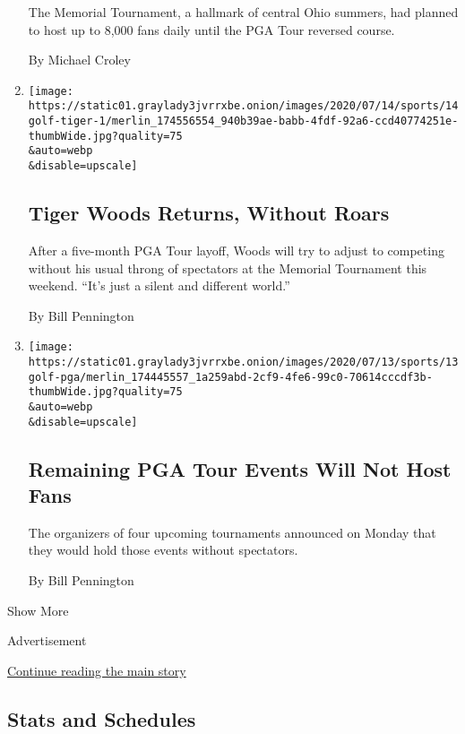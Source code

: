 \begin{enumerate}
  The Memorial Tournament, a hallmark of central Ohio summers, had
  planned to host up to 8,000 fans daily until the PGA Tour reversed
  course.

  By Michael Croley
\item
  \href{/2020/07/14/sports/golf/tiger-woods-memorial-tournament.html}{}

  \texttt{[image: https://static01.graylady3jvrrxbe.onion/images/2020/07/14/sports/14golf-tiger-1/merlin\_174556554\_940b39ae-babb-4fdf-92a6-ccd40774251e-thumbWide.jpg?quality=75\\\&auto=webp\\\&disable=upscale]}

  \hypertarget{tiger-woods-returns-without-roars}{%
  \subsection{Tiger Woods Returns, Without
  Roars}\label{tiger-woods-returns-without-roars}}

  After a five-month PGA Tour layoff, Woods will try to adjust to
  competing without his usual throng of spectators at the Memorial
  Tournament this weekend. ``It's just a silent and different world.''

  By Bill Pennington
\item
  \href{/2020/07/13/sports/golf/pga-tour-schedule-fans.html}{}

  \texttt{[image: https://static01.graylady3jvrrxbe.onion/images/2020/07/13/sports/13golf-pga/merlin\_174445557\_1a259abd-2cf9-4fe6-99c0-70614cccdf3b-thumbWide.jpg?quality=75\\\&auto=webp\\\&disable=upscale]}

  \hypertarget{remaining-pga-tour-events-will-not-host-fans}{%
  \subsection{Remaining PGA Tour Events Will Not Host
  Fans}\label{remaining-pga-tour-events-will-not-host-fans}}

  The organizers of four upcoming tournaments announced on Monday that
  they would hold those events without spectators.

  By Bill Pennington
\end{enumerate}

Show More

Advertisement

\protect\hyperlink{after-mid1}{Continue reading the main story}

\hypertarget{stats-and-schedules}{%
\subsection{Stats and Schedules}\label{stats-and-schedules}}

